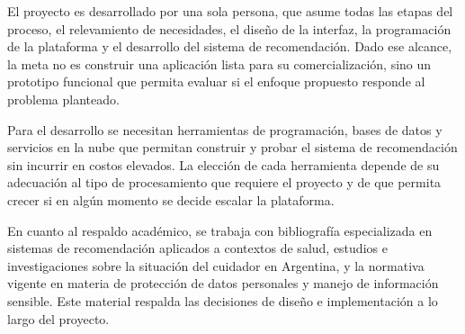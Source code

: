 El proyecto es desarrollado por una sola persona, que asume todas las etapas del proceso, el relevamiento de necesidades, el diseño de la interfaz, la programación de la plataforma y el desarrollo del sistema de recomendación. Dado ese alcance, la meta no es construir una aplicación lista para su comercialización, sino un prototipo funcional que permita evaluar si el enfoque propuesto responde al problema planteado.

Para el desarrollo se necesitan herramientas de programación, bases de datos y servicios en la nube que permitan construir y probar el sistema de recomendación sin incurrir en costos elevados. La elección de cada herramienta depende de su adecuación al tipo de procesamiento que requiere el proyecto y de que permita crecer si en algún momento se decide escalar la plataforma.

En cuanto al respaldo académico, se trabaja con bibliografía especializada en sistemas de recomendación aplicados a contextos de salud, estudios e investigaciones sobre la situación del cuidador en Argentina, y la normativa vigente en materia de protección de datos personales y manejo de información sensible. Este material respalda las decisiones de diseño e implementación a lo largo del proyecto.

